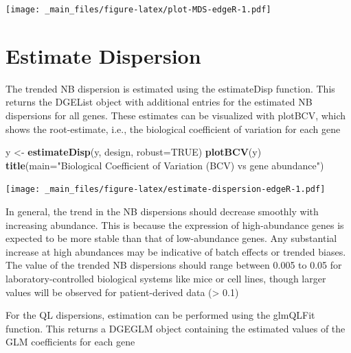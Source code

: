 \documentclass[
]{book}
\newenvironment{Shaded}{\begin{snugshade}}{\end{snugshade}}
\newcommand{\AttributeTok}[1]{\textcolor[rgb]{0.13,0.29,0.53}{#1}}
\newcommand{\ConstantTok}[1]{\textcolor[rgb]{0.56,0.35,0.01}{#1}}
\newcommand{\FunctionTok}[1]{\textcolor[rgb]{0.13,0.29,0.53}{\textbf{#1}}}
\newcommand{\NormalTok}[1]{#1}
\newcommand{\OtherTok}[1]{\textcolor[rgb]{0.56,0.35,0.01}{#1}}
\newcommand{\SpecialCharTok}[1]{\textcolor[rgb]{0.81,0.36,0.00}{\textbf{#1}}}
\newcommand{\StringTok}[1]{\textcolor[rgb]{0.31,0.60,0.02}{#1}}
\begin{document}
\texttt{[image: \_main\_files/figure-latex/plot-MDS-edgeR-1.pdf]}

\hypertarget{estimate-dispersion}{%
\section{Estimate Dispersion}\label{estimate-dispersion}}

The trended NB dispersion is estimated using the estimateDisp function.
This returns the DGEList object with additional entries for the
estimated NB dispersions for all genes. These estimates can be
visualized with plotBCV, which shows the root-estimate, i.e., the
biological coefficient of variation for each gene

\begin{Shaded}
\begin{Highlighting}[]
\NormalTok{y }\OtherTok{\textless{}{-}} \FunctionTok{estimateDisp}\NormalTok{(y, design, }\AttributeTok{robust=}\ConstantTok{TRUE}\NormalTok{)}
\FunctionTok{plotBCV}\NormalTok{(y)}
\FunctionTok{title}\NormalTok{(}\AttributeTok{main=}\StringTok{"Biological Coefficient of Variation (BCV) vs gene abundance"}\NormalTok{)}
\end{Highlighting}
\end{Shaded}

\texttt{[image: \_main\_files/figure-latex/estimate-dispersion-edgeR-1.pdf]}

In general, the trend in the NB dispersions should decrease smoothly
with increasing abundance. This is because the expression of
high-abundance genes is expected to be more stable than that of
low-abundance genes. Any substantial increase at high abundances may be
indicative of batch effects or trended biases. The value of the trended
NB dispersions should range between 0.005 to 0.05 for
laboratory-controlled biological systems like mice or cell lines, though
larger values will be observed for patient-derived data (\textgreater{} 0.1)

For the QL dispersions, estimation can be performed using the glmQLFit
function. This returns a DGEGLM object containing the estimated values
of the GLM coefficients for each gene

\begin{Shaded}
\end{Shaded}
\end{document}
